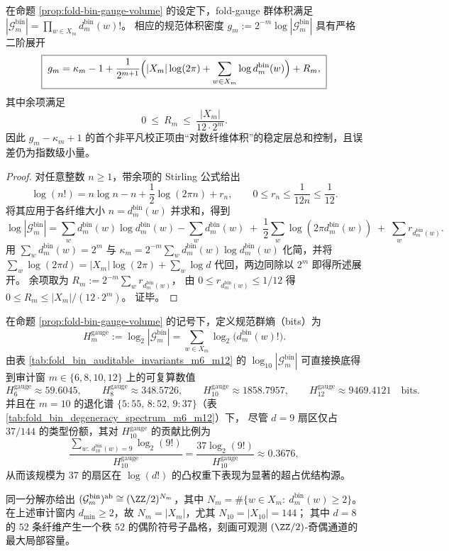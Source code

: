 \begin{theorem}\label{thm:fold-bin-gauge-volume-stirling-second-order}
在命题 \ref{prop:fold-bin-gauge-volume} 的设定下，fold-gauge 群体积满足
\(
|\mathcal{G}^{\mathrm{bin}}_m|=\prod_{w\in X_m} d^{\mathrm{bin}}_m(w)!
\)。
相应的规范体积密度 \(g_m:=2^{-m}\log|\mathcal{G}^{\mathrm{bin}}_m|\) 具有严格二阶展开
\[
\boxed{\;
g_m
=\kappa_m-1+\frac{1}{2^{m+1}}\Bigl(|X_m|\log(2\pi)+\sum_{w\in X_m}\log d^{\mathrm{bin}}_m(w)\Bigr)+R_m,
\;}
\]
其中余项满足
\[
\boxed{\;0\ \le\ R_m\ \le\ \frac{|X_m|}{12\cdot 2^m}.\;}
\]
因此 \(g_m-\kappa_m+1\) 的首个非平凡校正项由“对数纤维体积”的稳定层总和控制，且误差仍为指数级小量。
\end{theorem}
\begin{proof}
对任意整数 \(n\ge 1\)，带余项的 Stirling 公式给出
\[
\log(n!)=n\log n-n+\frac12\log(2\pi n)+r_n,
\qquad 0\le r_n\le \frac{1}{12n}\le \frac{1}{12}.
\]
将其应用于各纤维大小 \(n=d^{\mathrm{bin}}_m(w)\) 并求和，得到
\[
\log|\mathcal{G}^{\mathrm{bin}}_m|
=\sum_{w}d^{\mathrm{bin}}_m(w)\log d^{\mathrm{bin}}_m(w)-\sum_w d^{\mathrm{bin}}_m(w)
\;+\;\frac12\sum_w\log(2\pi d^{\mathrm{bin}}_m(w))
\;+\;\sum_w r_{d^{\mathrm{bin}}_m(w)}.
\]
用 \(\sum_w d^{\mathrm{bin}}_m(w)=2^m\) 与 \(\kappa_m=2^{-m}\sum_w d^{\mathrm{bin}}_m(w)\log d^{\mathrm{bin}}_m(w)\) 化简，并将
\(
\sum_w \log(2\pi d)=|X_m|\log(2\pi)+\sum_w\log d
\)
代回，两边同除以 \(2^m\) 即得所述展开。
余项取为
\(
R_m:=2^{-m}\sum_w r_{d^{\mathrm{bin}}_m(w)}
\)，
由 \(0\le r_{d^{\mathrm{bin}}_m(w)}\le 1/12\) 得
\(
0\le R_m\le |X_m|/(12\cdot 2^m)
\)。
证毕。
\end{proof}

\begin{remark}\label{rem:fold-bin-gauge-entropy-scale}
在命题 \ref{prop:fold-bin-gauge-volume} 的记号下，定义规范群熵（bits）为
\[
H_m^{\mathrm{gauge}}:=\log_2|\mathcal{G}_m^{\mathrm{bin}}|
=\sum_{w\in X_m}\log_2\bigl(d_m^{\mathrm{bin}}(w)!\bigr).
\]
由表 \ref{tab:fold_bin_auditable_invariants_m6_m12} 的 \(\log_{10}|\mathcal{G}_m^{\mathrm{bin}}|\) 可直接换底得到审计窗 \(m\in\{6,8,10,12\}\) 上的可复算数值
\[
H_6^{\mathrm{gauge}}\approx 59.6045,\qquad
H_8^{\mathrm{gauge}}\approx 348.5726,\qquad
H_{10}^{\mathrm{gauge}}\approx 1858.7957,\qquad
H_{12}^{\mathrm{gauge}}\approx 9469.4121\quad\text{bits}.
\]
并且在 \(m=10\) 的退化谱 \(\{5:55,\,8:52,\,9:37\}\)（表 \ref{tab:fold_bin_degeneracy_spectrum_m6_m12}）下，
尽管 \(d=9\) 扇区仅占 \(37/144\) 的类型份额，其对 \(H_{10}^{\mathrm{gauge}}\) 的贡献比例为
\[
\frac{\sum_{w:\ d^{\mathrm{bin}}_{10}(w)=9}\log_2(9!)}{H_{10}^{\mathrm{gauge}}}
=\frac{37\log_2(9!)}{H_{10}^{\mathrm{gauge}}}
\approx 0.3676,
\]
从而该规模为 \(37\) 的扇区在 \(\log(d!)\) 的凸权重下表现为显著的超占优结构源。
\par
同一分解亦给出 \((\mathcal{G}_m^{\mathrm{bin}})^{\mathrm{ab}}\cong(\ZZ/2)^{N_m}\)，其中
\(
N_m=\#\{w\in X_m:\ d^{\mathrm{bin}}_m(w)\ge 2\}
\)。
在上述审计窗内 \(d_{\min}\ge 2\)，故 \(N_m=|X_m|\)，尤其 \(N_{10}=|X_{10}|=144\)；
其中 \(d=8\) 的 \(52\) 条纤维产生一个秩 \(52\) 的偶阶符号子晶格，刻画可观测 \((\ZZ/2)\)-奇偶通道的最大局部容量。
\end{remark}

